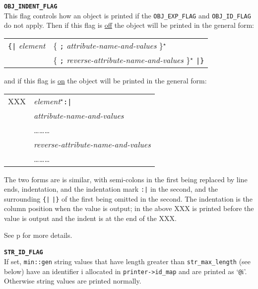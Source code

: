 \documentclass[12pt]{article}
\makeatletter
\newcommand{\TT}[1]{{\tt \bfseries #1}}
\newcommand{\ttmkey}[2]{\TT{#1}\index{#1@{\tt #1}!#2}}
\newcommand{\pagref}[1]{p\pageref{#1}}
\newcommand{\EOL}{\penalty \exhyphenpenalty}
\newenvironment{indpar}[1][0.3in]%
	{\begin{list}{}%
		     {\setlength{\itemsep}{0in}%
		      \setlength{\topsep}{0in}%
		      \setlength{\parsep}{1ex}%
		      \setlength{\labelwidth}{#1}%
		      \setlength{\leftmargin}{#1}%
		      \addtolength{\leftmargin}{\labelsep}}%
	 \item}%
	{\end{list}}
\newenvironment{itemlist}[1][1.2in]%
	{\begin{list}{}{\setlength{\labelwidth}{#1}%
		        \setlength{\leftmargin}{\labelwidth}%
		        \addtolength{\leftmargin}{+0.2in}%
		        \renewcommand{\makelabel}[1]{##1\hfill}}}%
	{\end{list}}
\makeatother
\begin{document}
\begin{indpar}[0.1in]
\begin{itemlist}[0.4in]
\item[\ttmkey{OBJ\_INDENT\_FLAG}{{\tt min::gen\_format} flag}]~\\
This flag controls how an object is printed if the
{\tt OBJ\_\EOL EXP\_\EOL FLAG} and
{\tt OBJ\_\EOL ID\_\EOL FLAG} do not apply.  Then if this flag
is \underline{off}
the object will be printed in the general form:
\begin{center}
\begin{tabular}{ll}
\verb/{|/ {\em element} & \{ \verb|;| {\em attribute-name-and-values}
                          \}$^\star$ \\
                        & \{ \verb|;| {\em reverse-attribute-name-and-values}
                          \}$^\star$  \verb/|}/
\end{tabular}
\end{center}
and if this flag is \underline{on} the object will be printed in the
general form:
\begin{center}
\begin{tabular}{r@{}l}
XXX	& {\em element}$^\star$\verb/:|/ \\
	& {\em attribute-name-and-values}\\
	& \ldots\ldots\ldots\\
	& {\em reverse-attribute-name-and-values}\\
	& \ldots\ldots\ldots\\
\end{tabular}
\end{center}

The two forms are is similar, with semi-colons in the first being
replaced by line ends, indentation, and the indentation mark
\verb/:|/ in the second, and the
surrounding \verb/{|/ \verb/|}/ of the first being omitted in the second.
The indentation is the column position when the value is output; in
the above XXX is printed before the value is output and the indent is
at the end of the XXX.

See \pagref{GEN-OBJ-FORM} for more details.

\item[\ttmkey{STR\_ID\_FLAG}{{\tt min::gen\_format} flag}]~\\
If set, {\tt min::gen} string values that have length greater
than {\tt str\_\EOL max\_\EOL length} (see below)
have an identifier i allocated
in {\tt printer->\EOL id\_\EOL map} and are printed as `{\tt @}i'.
Otherwise string values are printed normally.

\end{itemlist}\end{indpar}
\end{document}
